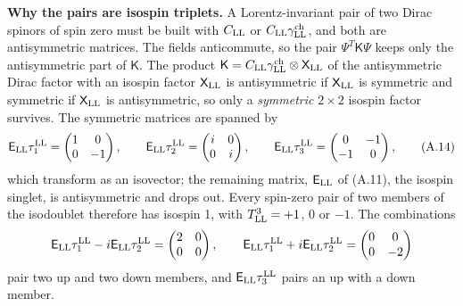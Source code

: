 \documentclass[
  10pt,
]{article}
\begin{document}
\textbf{Why the pairs are isospin triplets.} A Lorentz-invariant pair of
two Dirac spinors of spin zero must be built with \(C_{\rm LL}\) or
\(C_{\rm LL}\gamma^{\rm ch}_{\rm LL}\), and both are antisymmetric
matrices. The fields anticommute, so the pair \(\Psi^T\mathsf K\Psi\)
keeps only the antisymmetric part of \(\mathsf K\). The product
\(\mathsf K=C_{\rm LL}\gamma^{\rm ch}_{\rm LL}\otimes\mathsf X_{\rm LL}\)
of the antisymmetric Dirac factor with an isospin factor
\(\mathsf X_{\rm LL}\) is antisymmetric if \(\mathsf X_{\rm LL}\) is
symmetric and symmetric if \(\mathsf X_{\rm LL}\) is antisymmetric, so
only a \emph{symmetric} \(2\times2\) isospin factor survives. The
symmetric matrices are spanned by
\[\mathsf E_{\rm LL}\tau^{\rm LL}_1=\begin{pmatrix}1&0\\0&-1\end{pmatrix},\qquad\mathsf E_{\rm LL}\tau^{\rm LL}_2=\begin{pmatrix}i&0\\0&i\end{pmatrix},\qquad\mathsf E_{\rm LL}\tau^{\rm LL}_3=\begin{pmatrix}0&-1\\-1&0\end{pmatrix},\tag{A.14}\]
which transform as an isovector; the remaining matrix,
\(\mathsf E_{\rm LL}\) of (A.11), the isospin singlet, is antisymmetric
and drops out. Every spin-zero pair of two members of the isodoublet
therefore has isospin 1, with \(T^3_{\rm LL}=+1\), \(0\) or \(-1\). The
combinations
\[\mathsf E_{\rm LL}\tau^{\rm LL}_1-i\mathsf E_{\rm LL}\tau^{\rm LL}_2=\begin{pmatrix}2&0\\0&0\end{pmatrix},\qquad\mathsf E_{\rm LL}\tau^{\rm LL}_1+i\mathsf E_{\rm LL}\tau^{\rm LL}_2=\begin{pmatrix}0&0\\0&-2\end{pmatrix}\]
pair two up and two down members, and
\(\mathsf E_{\rm LL}\tau^{\rm LL}_3\) pairs an up with a down member.
\end{document}
